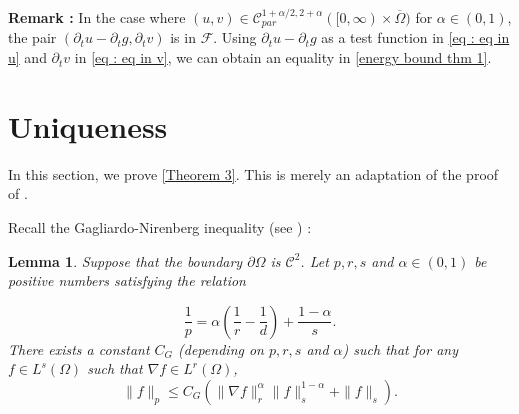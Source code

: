 \documentclass[reqno,12pt,twoside]{amsart}
\newtheorem{lemma}{Lemma}[section]
\numberwithin{equation}{section} \numberwithin{theorem}{section}
\numberwithin{proposition}{section} \numberwithin{lemma}{section}
\numberwithin{corollary}{section}
\numberwithin{definition}{section} \numberwithin{remark}{section}
\begin{document}
\textbf{Remark :} In the case where $(u,v)\in \mathcal{C}_{par}^{1+\alpha/2,2+\alpha}([0,\infty)\times \overline{\Omega})$ for $\alpha \in (0,1)$, the pair $(\partial_t u -\partial_t g, \partial_t v)$ is in $\mathcal{F}$. Using $\partial_t u-\partial_t g$ as a test function in \eqref{eq : eq in u} and $\partial_t v$ in \eqref{eq : eq in v}, we can obtain an equality in \eqref{energy bound thm 1}. 



\section{Uniqueness}
\label{Section unicité}

In this section, we prove \autoref{Theorem 3}. This is merely an adaptation of the proof of \cite[Theorem 2.3, Step 3]{FP04}. 

Recall the Gagliardo-Nirenberg inequality (see \cite{N59}) :

\begin{lemma}\label{lem : GN}
Suppose that the boundary $\partial\Omega$ is $\mathcal{C}^2$. 
Let $p, r,s$ and $\alpha\in (0,1)$ be positive numbers satisfying the relation 

\[\frac{1}{p} = \alpha \left(\frac{1}{r} -\frac{1}{d}\right) + \frac{1-\alpha}{s}.\]
There exists a constant $C_G$ (depending on $p, r, s$ and $\alpha$) such that for any $f \in L^s(\Omega)$ such that $\nabla f \in L^r(\Omega)$,
\[\|f\|_{p} \leqslant C_G \left(\|\nabla f\|_r^{\alpha} \|f\|_s^{1-\alpha} + \|f\|_s\right).\]
\end{lemma}
\end{document}
